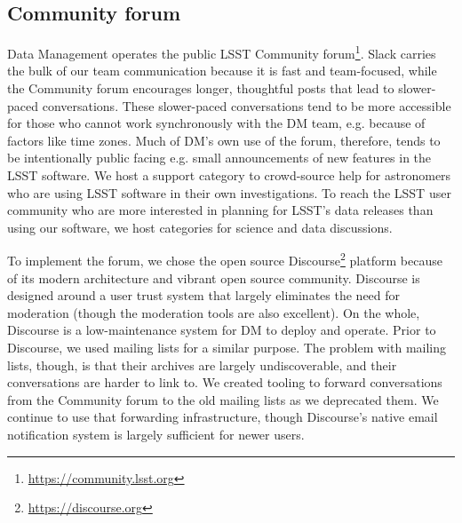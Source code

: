 \subsection{Community forum}
\label{sec:forum}

Data Management operates the public LSST Community forum\footnote{\url{https://community.lsst.org}}.
Slack carries the bulk of our team communication because it is fast and team-focused, while
the Community forum  encourages longer, thoughtful posts that lead to slower-paced conversations.
These slower-paced conversations tend to be more accessible for those who cannot work synchronously with the DM team, e.g. because of factors like time zones.
Much of DM's own use of the forum, therefore, tends to be intentionally public facing e.g. small announcements of new features in the LSST software.
We host a support category to crowd-source help for astronomers who are using LSST software in their own investigations.
To reach the LSST user community who are more interested in planning for LSST's data releases than using our software, we host categories for science and data discussions.

To implement the forum, we chose the open source Discourse\footnote{\url{https://discourse.org}} platform because of its modern architecture and vibrant open source community.
Discourse is designed around a user trust system that largely eliminates the need for moderation (though the moderation tools are also excellent).
On the whole, Discourse is a low-maintenance system for DM to deploy and operate.
Prior to Discourse, we used mailing lists for a similar purpose.
The problem with mailing lists, though, is that their archives are largely undiscoverable, and their conversations are harder to link to.
We created tooling to forward conversations from the Community forum to the old mailing lists as we deprecated them.
We continue to use that forwarding infrastructure, though Discourse's native email notification system is largely sufficient for newer users.
